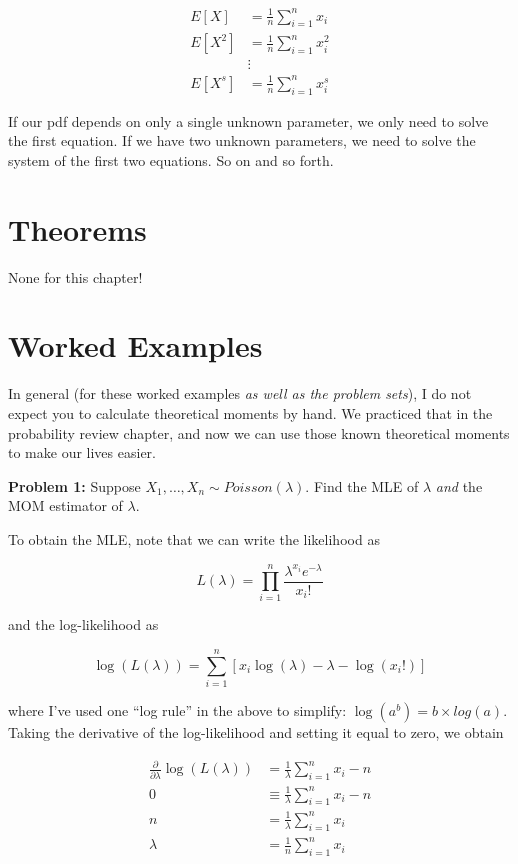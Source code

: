 \documentclass[
  letterpaper,
  DIV=11,
  numbers=noendperiod]{scrreprt}
\begin{document}
\begin{align*}
  E[X] & = \frac{1}{n} \sum_{i = 1}^n x_i \\
  E[X^2] & = \frac{1}{n} \sum_{i = 1}^n x_i^2 \\
  & \vdots \\
  E[X^s] & = \frac{1}{n} \sum_{i = 1}^n x_i^s
\end{align*}

If our pdf depends on only a single unknown parameter, we only need to
solve the first equation. If we have two unknown parameters, we need to
solve the system of the first two equations. So on and so forth.

\hypertarget{theorems-2}{%
\section{Theorems}\label{theorems-2}}

None for this chapter!

\hypertarget{worked-examples-2}{%
\section{Worked Examples}\label{worked-examples-2}}

In general (for these worked examples \emph{as well as the problem
sets}), I do not expect you to calculate theoretical moments by hand. We
practiced that in the probability review chapter, and now we can use
those known theoretical moments to make our lives easier.

\textbf{Problem 1:} Suppose \(X_1, \dots, X_n \sim Poisson(\lambda)\).
Find the MLE of \(\lambda\) \emph{and} the MOM estimator of \(\lambda\).

To obtain the MLE, note that we can write the likelihood as

\[
L(\lambda) = \prod_{i = 1}^n \frac{\lambda^{x_i} e^{-\lambda}}{x_i!}
\]

and the log-likelihood as

\[
\log(L(\lambda)) = \sum_{i = 1}^n \left[ x_i\log(\lambda) - \lambda - \log(x_i!)\right]
\]

where I've used one ``log rule'' in the above to simplify:
\(\log(a^b) = b \times log(a)\). Taking the derivative of the
log-likelihood and setting it equal to zero, we obtain

\begin{align*}
  \frac{\partial}{\partial \lambda} \log(L(\lambda)) & = \frac{1}{\lambda} \sum_{i = 1}^n x_i - n \\
  0 & \equiv \frac{1}{\lambda} \sum_{i = 1}^n x_i - n \\
  n & = \frac{1}{\lambda} \sum_{i = 1}^n x_i \\
  \lambda & = \frac{1}{n} \sum_{i = 1}^n x_i
\end{align*}
\end{document}
